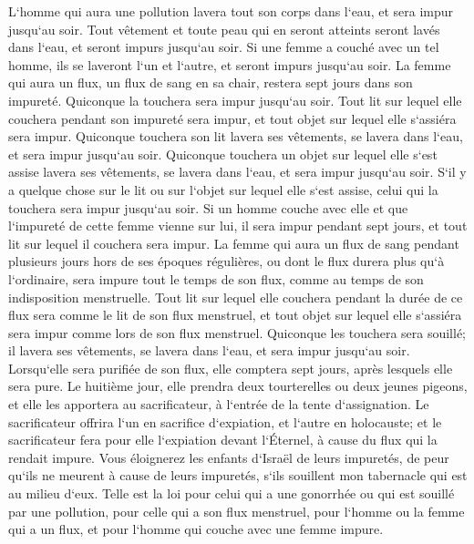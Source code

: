 \verse L`homme qui aura une pollution lavera tout son corps dans l`eau, et sera impur jusqu`au soir. 
\verse Tout vêtement et toute peau qui en seront atteints seront lavés dans l`eau, et seront impurs jusqu`au soir. 
\verse Si une femme a couché avec un tel homme, ils se laveront l`un et l`autre, et seront impurs jusqu`au soir. 
\verse La femme qui aura un flux, un flux de sang en sa chair, restera sept jours dans son impureté. Quiconque la touchera sera impur jusqu`au soir. 
\verse Tout lit sur lequel elle couchera pendant son impureté sera impur, et tout objet sur lequel elle s`assiéra sera impur. 
\verse Quiconque touchera son lit lavera ses vêtements, se lavera dans l`eau, et sera impur jusqu`au soir. 
\verse Quiconque touchera un objet sur lequel elle s`est assise lavera ses vêtements, se lavera dans l`eau, et sera impur jusqu`au soir. 
\verse S`il y a quelque chose sur le lit ou sur l`objet sur lequel elle s`est assise, celui qui la touchera sera impur jusqu`au soir. 
\verse Si un homme couche avec elle et que l`impureté de cette femme vienne sur lui, il sera impur pendant sept jours, et tout lit sur lequel il couchera sera impur. 
\verse La femme qui aura un flux de sang pendant plusieurs jours hors de ses époques régulières, ou dont le flux durera plus qu`à l`ordinaire, sera impure tout le temps de son flux, comme au temps de son indisposition menstruelle. 
\verse Tout lit sur lequel elle couchera pendant la durée de ce flux sera comme le lit de son flux menstruel, et tout objet sur lequel elle s`assiéra sera impur comme lors de son flux menstruel. 
\verse Quiconque les touchera sera souillé; il lavera ses vêtements, se lavera dans l`eau, et sera impur jusqu`au soir. 
\verse Lorsqu`elle sera purifiée de son flux, elle comptera sept jours, après lesquels elle sera pure. 
\verse Le huitième jour, elle prendra deux tourterelles ou deux jeunes pigeons, et elle les apportera au sacrificateur, à l`entrée de la tente d`assignation. 
\verse Le sacrificateur offrira l`un en sacrifice d`expiation, et l`autre en holocauste; et le sacrificateur fera pour elle l`expiation devant l`Éternel, à cause du flux qui la rendait impure. 
\verse Vous éloignerez les enfants d`Israël de leurs impuretés, de peur qu`ils ne meurent à cause de leurs impuretés, s`ils souillent mon tabernacle qui est au milieu d`eux. 
\verse Telle est la loi pour celui qui a une gonorrhée ou qui est souillé par une pollution, 
\verse pour celle qui a son flux menstruel, pour l`homme ou la femme qui a un flux, et pour l`homme qui couche avec une femme impure. 

